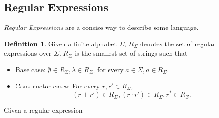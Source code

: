 \documentclass{article}
\theoremstyle{definition}
\newtheorem*{definition*}{Definition}
\begin{document}
\subsection{Regular Expressions}
\textit{Regular Expressions} are a concise way to describe some language. 
\begin{bigbox}
    \begin{definition*}
        Given a finite alphabet $\Sigma$, $R_\Sigma$ denotes the set of regular expressions over $\Sigma$. $R_\Sigma$ is 
        the smallest set of strings such that
        \begin{itemize}
            \item Base case: $\emptyset\in R_\Sigma,\lambda\in R_\Sigma$, for every $a\in\Sigma,a\in R_\Sigma.$
            \item Constructor cases: For every $r,r'\in R_\Sigma,$
            \begin{equation*}
                (r+r')\in R_\Sigma,(r\cdot r')\in R_\Sigma,r^*\in R_\Sigma.
            \end{equation*}
        \end{itemize}
    \end{definition*}
\end{bigbox}

\begin{bigbox}
    Given a regular expression
\end{bigbox}
\end{document}
